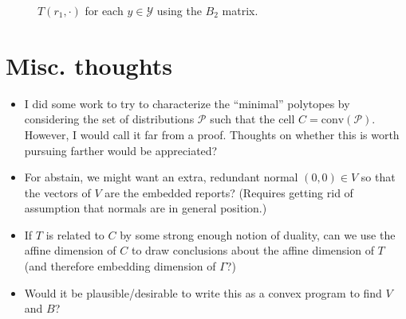 \documentclass[12pt]{article}
\renewcommand{\P}{\mathcal{P}}
\newcommand{\Y}{\mathcal{Y}}
\newcommand{\conv}{\mathrm{conv}}
\begin{document}
\begin{figure}
\begin{minipage}{0.24\linewidth}
\end{minipage}
\begin{minipage}{0.24\linewidth}
\end{minipage}
\begin{minipage}{0.24\linewidth}
\end{minipage}
\begin{minipage}{0.24\linewidth}
\end{minipage}
\caption{$T(r_1, \cdot)$ for each $y \in \Y$ using the $B_2$ matrix.}
\label{fig:abstain-T-report-r1-B2}
\end{figure}


\section{Misc. thoughts}
\begin{itemize}
	\item I did some work to try to characterize the ``minimal'' polytopes by considering the set of distributions $\P$ such that the cell $C = \conv(\P)$.
	However, I would call it far from a proof.
	Thoughts on whether this is worth pursuing farther would be appreciated?
	
	\item For abstain, we might want an extra, redundant normal $(0,0) \in V$ so that the vectors of $V$ are the embedded reports?  
	(Requires getting rid of assumption that normals are in general position.)
	
	\item If $T$ is related to $C$ by some strong enough notion of duality, can we use the affine dimension of $C$ to draw conclusions about the affine dimension of $T$ (and therefore embedding dimension of $\Gamma$?) 
	
	\item Would it be plausible/desirable to write this as a convex program to find $V$ and $B$?
	
\end{itemize}
\end{document}
